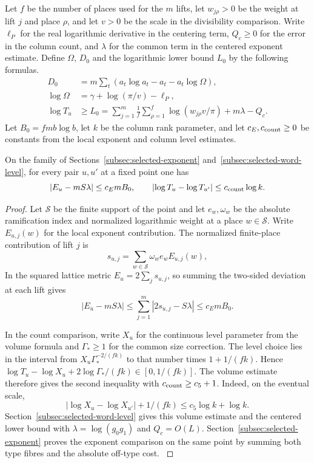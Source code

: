 Let \(f\) be the number of places used for the \(m\) lifts, let
\(w_{j\rho}>0\) be the weight at lift \(j\) and place \(\rho\),
and let \(v>0\) be the scale in the divisibility comparison.
Write \(\ell_P\) for the real logarithmic derivative in the
centering term, \(Q_c\ge0\) for the error in the column count,
and \(\lambda\) for the common term in the centered exponent estimate.
Define \(\Omega\), \(D_0\) and the logarithmic lower bound
\(L_0\) by the following formulas.
\[
 \begin{aligned}
 D_0 &= m\sum_t(a_t\log a_t-a_t-a_t\log\Omega),\\
 \log\Omega&=\gamma+\log(\pi/v)-\ell_P,\\
 \log T_u &\ge L_0
     =\sum_{j=1}^m\frac1f\sum_{\rho=1}^f
               \log(w_{j\rho}v/\pi)+m\lambda-Q_c .
 \end{aligned}
\]
Let \(B_0=fmb\log b\), let \(k\) be the column rank parameter,
and let \(c_E,c_{\rm count}\ge0\) be constants from the local exponent and column level estimates.
\begin{lemma}\label{lem:exponent-level-spread}
On the family of Sections~\ref{subsec:selected-exponent}
and~\ref{subsec:selected-word-level}, for every pair \(u,u'\)
at a fixed point one has
\begin{equation}\label{eq:slope-word-count-exponent}
 \left|E_u-mS\lambda\right|\le c_E mB_0,
 \qquad
 \left|\log T_u-\log T_{u'}\right|\le c_{\rm count}\log k .
\end{equation}
\end{lemma}
\begin{proof}
Let \(\mathcal S\) be the finite support of the point and let
\(e_w,\omega_w\) be the absolute ramification index and
normalized logarithmic weight at a place \(w\in\mathcal S\).
Write \(E_{u,j}(w)\) for the local exponent contribution.
The normalized finite-place contribution of lift \(j\) is
\[
 s_{u,j}=\sum_{w\in\mathcal S}\omega_w e_w E_{u,j}(w),
\]
In the squared lattice metric \(E_u=2\sum_j s_{u,j}\), so summing
the two-sided deviation at each lift gives
\[
 |E_u-mS\lambda|\le\sum_{j=1}^m |2s_{u,j}-S\lambda|
                     \le c_E mB_0 .
\]

In the count comparison, write \(X_u\)
for the continuous level parameter from the volume formula and
\(\Gamma_*\ge1\) for the common size correction. The level choice
lies in the interval from \(X_u\Gamma_*^{-2/(fk)}\) to that
number times \(1+1/(fk)\). Hence
\(\log T_u-\log X_u+2\log\Gamma_* /(fk)\in[0,1/(fk)]\).
The volume estimate therefore gives the second inequality with \(c_{\rm count}\ge c_5+1\). Indeed, on the eventual scale,
\[
 |\log X_u-\log X_{u'}|+1/(fk)\le c_5\log k+\log k .
\] Section~\ref{subsec:selected-word-level} gives this volume estimate
and the centered lower bound with \(\lambda=\log(g_0g_1)\) and
\(Q_c=O(L)\). Section~\ref{subsec:selected-exponent} proves the exponent comparison on the same point by summing both type fibres and the absolute off-type cost.
\label{cor:frames-3}
\end{proof}
